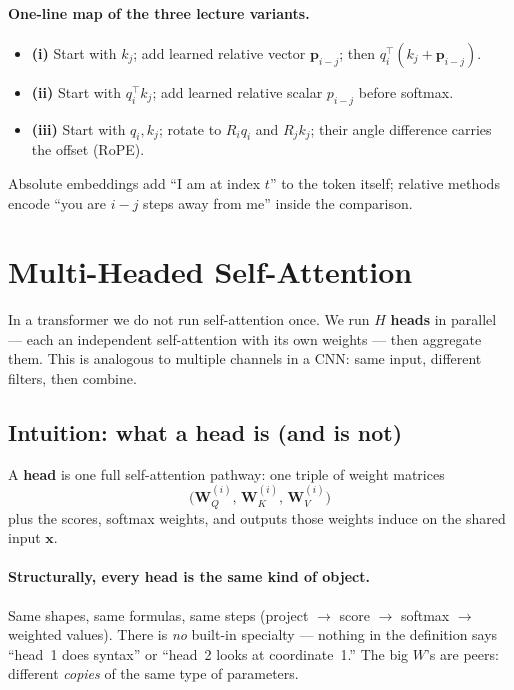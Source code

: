 \documentclass[11pt]{article}
\begin{document}
\paragraph{One-line map of the three lecture variants.}
\begin{itemize}[leftmargin=*]
  \item \textbf{(i)} Start with \(k_j\); add learned relative vector
        \(\mathbf{p}_{i-j}\); then \(q_i^\top(k_j+\mathbf{p}_{i-j})\).
  \item \textbf{(ii)} Start with \(q_i^\top k_j\); add learned relative
        scalar \(p_{i-j}\) before softmax.
  \item \textbf{(iii)} Start with \(q_i,k_j\); rotate to
        \(R_i q_i\) and \(R_j k_j\); their angle difference carries the
        offset (RoPE).
\end{itemize}
Absolute embeddings add ``I am at index \(t\)'' to the token itself;
relative methods encode ``you are \(i-j\) steps away from me'' inside the
comparison.

\section{Multi-Headed Self-Attention}

In a transformer we do not run self-attention once. We run \(H\)
\textbf{heads} in parallel --- each an independent self-attention with its
own weights --- then aggregate them. This is analogous to multiple channels
in a CNN: same input, different filters, then combine.

\subsection{Intuition: what a head is (and is not)}

A \textbf{head} is one full self-attention pathway: one triple of weight
matrices
\[
  \bigl(\mathbf{W}_Q^{(i)},\,\mathbf{W}_K^{(i)},\,\mathbf{W}_V^{(i)}\bigr)
\]
plus the scores, softmax weights, and outputs those weights induce on the
shared input \(\mathbf{x}\).

\paragraph{Structurally, every head is the same kind of object.}
Same shapes, same formulas, same steps (project \(\to\) score \(\to\)
softmax \(\to\) weighted values). There is \emph{no} built-in specialty
--- nothing in the definition says ``head~1 does syntax'' or ``head~2
looks at coordinate~1.'' The big \(W\)'s are peers: different
\emph{copies} of the same type of parameters.
\end{document}

